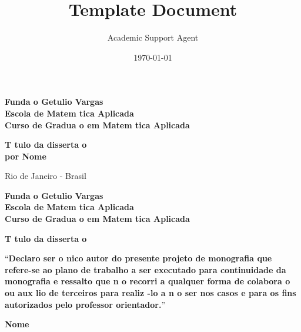 \documentclass{article}
\title{Template Document}
\author{Academic Support Agent}
\date{\today}
\begin{document}
\maketitle

\begin{titlepage}
\begin{center}
\textbf{\LARGE Funda o Getulio Vargas}\\ 
\textbf{\LARGE Escola de Matem tica Aplicada}\\
\textbf{\LARGE Curso de Gradua o em Matem tica Aplicada}

\par
\vspace{170pt}
\textbf{\Large T tulo da disserta o}\\
\vspace{80pt}
\textbf{\Large por Nome}\\
\end{center}

\par
\vfill
\begin{center}
{{\normalsize Rio de Janeiro - Brasil}\\
{\normalsize \the\year}}
\end{center}
\end{titlepage}

\thispagestyle{empty}

\newpage
\begin{center}
\textbf{\LARGE Funda o Getulio Vargas}\\ 
\textbf{\LARGE Escola de Matem tica Aplicada}\\
\textbf{\LARGE Curso de Gradua o em Matem tica Aplicada}

\par
\vspace{100pt}
\textbf{\Large T tulo da disserta o}


\par
\vspace{65pt}
``\textbf{Declaro ser o  nico autor do presente projeto de
monografia que refere-se ao plano de trabalho a ser executado para continuidade da monografia e ressalto que n o recorri a qualquer forma de colabora o ou aux lio de terceiros para realiz -lo a n o ser nos casos e para os fins autorizados pelo professor orientador.}''
\end{center}

\par
\vspace{65pt}
\begin{center}


\hrulefill

\vspace{5pt}
\textbf{\Large Nome}
\end{center}
\end{document}
